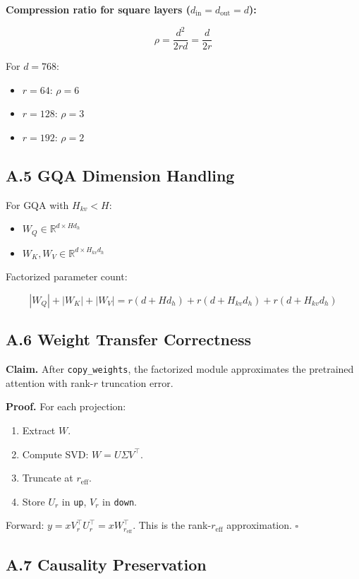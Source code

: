 \textbf{Compression ratio for square layers ($d_\text{in} = d_\text{out} = d$):}

\[
\rho = \frac{d^2}{2rd} = \frac{d}{2r}
\tag{A.3}
\]

For $d = 768$:
\begin{itemize}
\item $r = 64$: $\rho = 6$
\item $r = 128$: $\rho = 3$
\item $r = 192$: $\rho = 2$

\end{itemize}
\subsection{A.5 GQA Dimension Handling}

For GQA with $H_{kv} < H$:

\begin{itemize}
\item $W_Q \in \mathbb{R}^{d \times H d_h}$
\item $W_K, W_V \in \mathbb{R}^{d \times H_{kv} d_h}$

\end{itemize}
Factorized parameter count:

\[
|W_Q| + |W_K| + |W_V| = r(d + H d_h) + r(d + H_{kv} d_h) + r(d + H_{kv} d_h)
\tag{A.4}
\]

\subsection{A.6 Weight Transfer Correctness}

\textbf{Claim.} After \texttt{copy\_weights}, the factorized module approximates the 
pretrained attention with rank-$r$ truncation error.

\textbf{Proof.} For each projection:
\begin{enumerate}
\item Extract $W$.
\item Compute SVD: $W = U \Sigma V^\top$.
\item Truncate at $r_\text{eff}$.
\item Store $U_r$ in \texttt{up}, $V_r$ in \texttt{down}.

\end{enumerate}
Forward: $y = x V_r^\top U_r^\top = x W_{r_\text{eff}}^\top$. This is the 
rank-$r_\text{eff}$ approximation. $\square$

\subsection{A.7 Causality Preservation}

